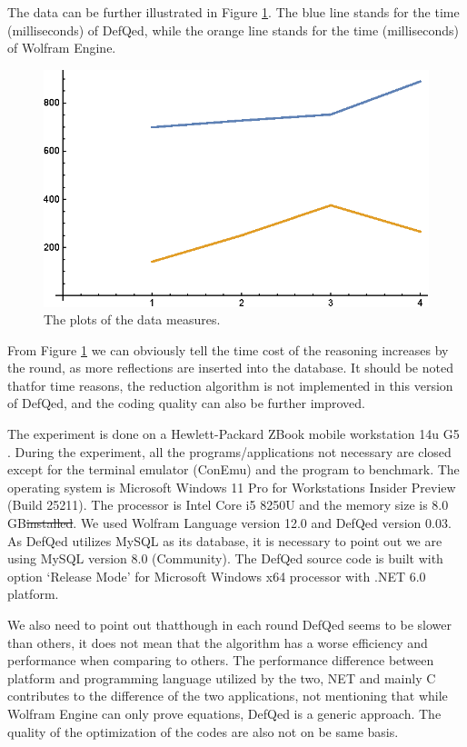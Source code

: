 \documentclass{aims}
\numberwithin{equation}{section}
\numberwithin{theorem}{section}	%
\numberwithin{axiom}{section}	%
\numberwithin{definition}{section}	%
\providecommand{\DIFadd}[1]{{\protect\color{blue}\uwave{#1}}} %
\providecommand{\DIFdel}[1]{{\protect\color{red}\sout{#1}}}                      %
\providecommand{\DIFaddbegin}{} %
\providecommand{\DIFaddend}{} %
\providecommand{\DIFdelbegin}{} %
\providecommand{\DIFdelend}{} %
\begin{document}
	The data can be further illustrated in Figure \ref{figure-4}. The blue line stands for the time (milliseconds) of DefQed, while the orange line stands for the time (milliseconds) of Wolfram Engine.

	\begin{figure}[H]
		\centering
		\includegraphics{plot.eps}
		\caption{The plots of the data measures.}
		\label{figure-4}
	\end{figure}

	From Figure \ref{figure-4} we can obviously tell the time cost of the reasoning increases by the round, as more reflections are inserted into the database. It should be noted that\DIFaddbegin \DIFadd{, }\DIFaddend for time reasons, the reduction algorithm is not implemented in this version of DefQed, and the coding quality can also be further improved.

	The experiment is done on a Hewlett-Packard ZBook mobile workstation 14u G5 \cite{HP-2018}. During the experiment, all the programs/applications not necessary are closed except for the terminal emulator (ConEmu) and the program to benchmark. The operating system is Microsoft Windows 11 Pro for Workstations Insider Preview (Build 25211). The processor is Intel Core i5 8250U and the memory size is 8.0 GB\DIFdelbegin \DIFdel{installed}\DIFdelend . We used Wolfram Language version 12.0 and DefQed version 0.03. As DefQed utilizes MySQL as its database, it is necessary to point out we are using MySQL version 8.0 (Community). The DefQed source code is built with option `Release Mode' for Microsoft Windows x64 processor with .NET 6.0 platform.

	We also need to point out that\DIFaddbegin \DIFadd{, }\DIFaddend though in each round DefQed seems to be slower than others, it does not mean that the algorithm has a worse efficiency and performance when comparing to others. The performance difference between platform and programming language utilized by the two, NET and mainly C contributes to the difference of the two applications, not mentioning that while Wolfram Engine can only prove equations, DefQed is a generic approach. The quality of the optimization of the codes are also not on be same basis.
\end{document}
